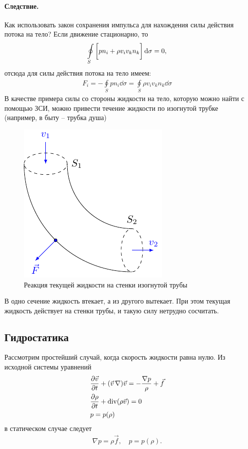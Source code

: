 \paragraph{Следствие.} Как использовать закон сохранения импульса для нахождения силы действия потока на тело? Если движение стационарно, то
\begin{align*}
\oint\limits_{ S } \left[\vphantom{\int} p n _ { i } + \rho v _ { i } v _ { k } n _ { k } \right] \dd \sigma = 0,
\end{align*}
отсюда для силы действия потока на тело имеем:
\begin{align*}
F _ { i } = - \oint \limits_ { S } p n _ { i } \dd \sigma = \oint \limits_ { S } \rho v _ { i } v _ { k } n _ { k } \dd \sigma
\end{align*}
В качестве примера силы со стороны жидкости на тело, которую можно найти с помощью ЗСИ, можно привести течение жидкости по изогнутой трубке (например, в быту -- трубка душа)
\begin{figure}[H]
	\centering
	\includegraphics[scale=1.2]{img/dush.pdf}
	\caption{Реакция текущей жидкости на стенки изогнутой трубы}
	\label{fig:figure5}
\end{figure}
В одно сечение жидкость втекает, а из другого вытекает. При этом текущая жидкость действует на стенки трубы, и такую силу нетрудно сосчитать.


\subsection{Гидростатика}
Рассмотрим простейший случай, когда скорость жидкости равна нулю. Из исходной системы уравнений 
\begin{align*}
& \frac { \partial \vec{v} } { \partial t } + ( \vec{v}\,\nabla ) \vec{v} = - \frac { \nabla p } { \rho } + \vec { f } \\
& \frac { \partial \rho } { \partial t } + \operatorname{div} ( \rho \vec{v} ) = 0 \\
& p = p ( \rho )
\end{align*}
в статическом случае следует
\begin{align*}
\nabla p = \rho \vec { f }, \quad 
p = p ( \rho ).
\end{align*}

